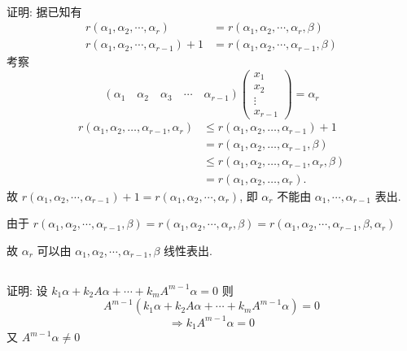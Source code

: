 	 \paragraph{} %
		 证明: 据已知有
		 \begin{align*}
			 r(\alpha_{1}, \alpha_{2}, \cdots, \alpha_{r})       & = r(\alpha_{1}, \alpha_{2}, \cdots, \alpha_{r}, \beta)   \\
			 r(\alpha_{1}, \alpha_{2}, \cdots, \alpha_{r-1}) + 1 & = r(\alpha_{1}, \alpha_{2}, \cdots, \alpha_{r-1}, \beta)
		 \end{align*}
		 考察
		 \[ (\alpha_{1}\quad \alpha_{2}\quad \alpha_{3}\quad \cdots\quad \alpha_{r-1})
			 \begin{pmatrix}
				 x_{1}  \\
				 x_{2}  \\
				 \vdots \\
				 x_{r-1}\end{pmatrix} = \alpha_{r} \]
		 \begin{align*}
			 r(\alpha_{1}, \alpha_{2}, \dots, \alpha_{r-1}, \alpha_{r}) & \leq r(\alpha_{1}, \alpha_{2}, \dots, \alpha_{r-1}) + 1                \\
			                                                            & = r(\alpha_{1}, \alpha_{2}, \dots, \alpha_{r-1}, \beta)                \\
			                                                            & \leq r(\alpha_{1}, \alpha_{2}, \dots, \alpha_{r-1}, \alpha_{r}, \beta) \\
			                                                            & = r(\alpha_{1}, \alpha_{2}, \dots, \alpha_{r}).
		 \end{align*}
		 故 \( r(\alpha_{1}, \alpha_{2}, \cdots, \alpha_{r-1}) + 1 = r(\alpha_{1}, \alpha_{2}, \cdots, \alpha_{r}) \), 即 \( \alpha_{r} \) 不能由 \( \alpha_{1}, \cdots, \alpha_{r-1} \) 表出.

		 由于 \( r(\alpha_{1}, \alpha_{2}, \cdots, \alpha_{r-1}, \beta) = r(\alpha_{1}, \alpha_{2}, \cdots, \alpha_{r}, \beta) = r(\alpha_{1}, \alpha_{2}, \cdots, \alpha_{r-1}, \beta, \alpha_{r}) \)

		 故 \( \alpha_{r} \) 可以由 \( \alpha_{1}, \alpha_{2}, \cdots, \alpha_{r-1}, \beta \) 线性表出.


 \subsection{} %

	 \paragraph{} %
		 证明: 设 \( k_{1}\alpha + k_{2}A\alpha + \cdots + k_{m}A^{m-1}\alpha = 0 \) 则
		 \[ A^{m-1}(k_{1}\alpha + k_{2}A\alpha + \cdots + k_{m}A^{m-1}\alpha) = 0 \]
		 \[ \Rightarrow k_{1}A^{m-1}\alpha = 0 \]
		 又 \( A^{m-1}\alpha \neq 0 \)

